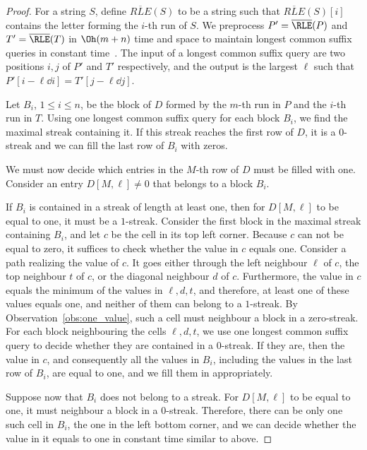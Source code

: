 \DTWone*
\begin{proof}
For a string $S$, define $\overline{RLE}(S)$ to be a string such that $\overline{RLE}(S)[i]$ contains the letter forming the $i$-th run of $S$. We preprocess $P' = \overline{\RLE}(P)$ and $T' = \overline{\RLE}(T)$ in $\Oh(m+n)$ time and space to maintain longest common suffix queries in constant time~\cite{10.1007/11780441_5}. The input of a longest common suffix query are two positions $i,j$ of $P'$ and $T'$ respectively, and the output is the largest $\ell$ such that $P'[i-\ell \dd i] = T'[j-\ell \dd j]$.

Let $B_i$, $1 \le i \le n$, be the block of $D$ formed by the $m$-th run in $P$ and the $i$-th run in $T$. Using one longest common suffix query for each block $B_i$, we find the maximal streak containing it. If this streak reaches the first row of $D$, it is a $0$-streak and we can fill the last row of $B_i$ with zeros. 

We must now decide which entries in the $M$-th row of $D$ must be filled with one. Consider an entry $D[M,\ell] \neq 0$ that belongs to a block $B_i$. 

If $B_i$ is contained in a streak of length at least one, then for $D[M,\ell]$ to be equal to one, it must be a $1$-streak. Consider the first block in the maximal  streak containing $B_i$, and let $c$ be the cell in its top left corner. Because $c$ can not be equal to zero, it suffices to check whether the value in $c$ equals one. Consider a path realizing the value of $c$. It goes either through the left neighbour $\ell$ of $c$, the top neighbour $t$ of $c$, or the diagonal neighbour $d$ of $c$. Furthermore, the value in $c$ equals the minimum of the values in $\ell, d, t$, and therefore, at least one of these values equals one, and neither of them can belong to a $1$-streak. By Observation~\ref{obs:one_value}, such a cell must neighbour a block in a zero-streak. For each block neighbouring the cells $\ell, d, t$, we use one longest common suffix query to decide whether they are contained in a $0$-streak. If they are, then the value in $c$, and consequently all the values in $B_i$, including the values in the last row of $B_i$, are equal to one, and we fill them in appropriately. 

Suppose now that $B_i$ does not belong to a streak. For $D[M,\ell]$ to be equal to one, it must neighbour a block in a $0$-streak. Therefore, there can be only one such cell in $B_i$, the one in the left bottom corner, and we can decide whether the value in it equals to one in constant time similar to above.
\end{proof}